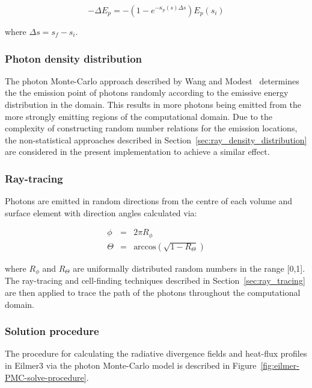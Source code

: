 \begin{equation}
 - \Delta E_{p} = - ( 1 - e^{-\kappa_p(s) \Delta s } ) E_{p}(s_{i})
 \label{eq:E_p}
\end{equation}

\noindent where $\Delta s = s_{f} - s_{i}$.

\subsubsection{Photon density distribution}

The photon Monte-Carlo approach described by Wang and Modest~\cite{WM2007} determines the the emission point of photons randomly according to the emissive energy distribution in the domain.
This results in more photons being emitted from the more strongly emitting regions of the computational domain.
Due to the complexity of constructing random number relations for the emission locations, the non-statistical approaches described in Section~\ref{sec:ray_density_distribution} are considered in the present implementation to achieve a similar effect.

\subsubsection{Ray-tracing}

Photons are emitted in random directions from the centre of each volume and surface element with direction angles calculated via:

\begin{eqnarray}
 \phi &=& 2 \pi R_{\phi} \\
 \Theta &=& \text{arccos} \left ( \sqrt{ 1 - R_\Theta } \right )
\end{eqnarray}

\noindent where $R_{\phi}$ and $R_{\Theta}$ are uniformally distributed random numbers in the range [0,1].
The ray-tracing and cell-finding techniques described in Section~\ref{sec:ray_tracing} are then applied to trace the path of the photons throughout the computational domain.

\subsubsection{Solution procedure}

The procedure for calculating the radiative divergence fields and heat-flux profiles in Eilmer3  via the photon Monte-Carlo model is described in Figure~\ref{fig:eilmer-PMC-solve-procedure}.

